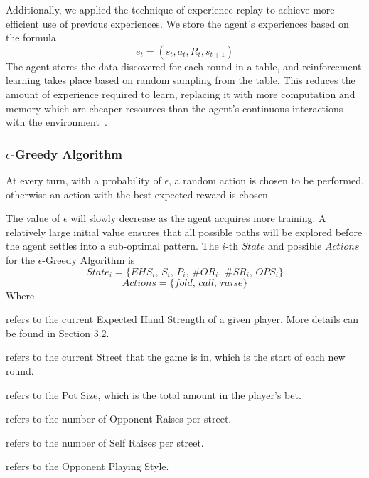 \documentclass{article}
\begin{document}
Additionally, we applied the technique of experience replay to achieve more efficient use of previous experiences. We store the agent's experiences based on the formula
\begin{displaymath}
e_t=\left(s_t,a_t,R_t,s_{t+1}\right)
\end{displaymath}
The agent stores the data discovered for each round in a table, and reinforcement learning takes place based on random sampling from the table. This reduces the amount of experience required to learn, replacing it with more computation and memory which are cheaper resources than the agent's continuous interactions with the environment~\cite{sqas:replay}.

\subsubsection{$\epsilon$-Greedy Algorithm}

At every turn, with a probability of $\epsilon$, a random action is chosen to be performed, otherwise an action with the best expected reward is chosen.

The value of $\epsilon$ will slowly decrease as the agent acquires more training. A relatively large initial value ensures that all possible paths will be explored before the agent settles into a sub-optimal pattern. The $i$-th $State$ and possible $Actions$ for the $\epsilon$-Greedy Algorithm is
\begin{displaymath}
State_i = \{ EHS_i \text{, } S_i \text{, }P_i\text{, }\#OR_i\text{, }\#SR_i\text{, }OPS_i\}
\end{displaymath}
\begin{displaymath}
Actions = \{ fold\text{, }call\text{, }raise \}
\end{displaymath}
Where

\begin{description}[style=multiline,leftmargin=10mm]
\item [\emph{EHS}]refers to the current Expected Hand Strength of a given player. More details can be found in Section 3.2.
\item [\emph{S}]refers to the current Street that the game is in, which is the start of each new round.
\item [\emph{P}]refers to the Pot Size, which is the total amount in the player's bet.
\item [\emph{\#OR}]refers to the number of Opponent Raises per street.
\item [\emph{\#SR}]refers to the number of Self Raises per street.
\item [\emph{OPS}]refers to the Opponent Playing Style.
\end{description}
\end{document}
